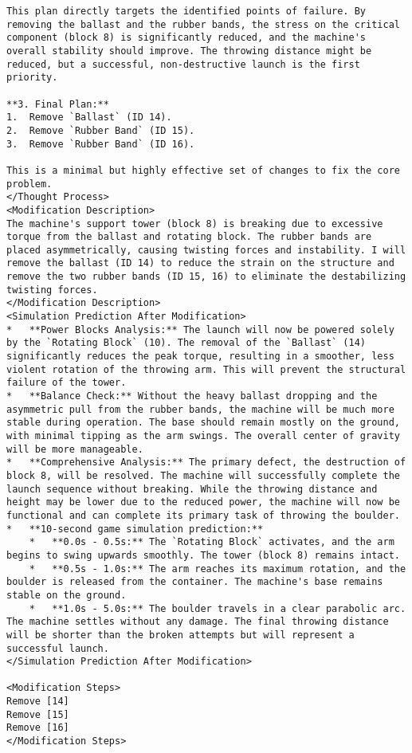 \begin{lstlisting}
This plan directly targets the identified points of failure. By removing the ballast and the rubber bands, the stress on the critical component (block 8) is significantly reduced, and the machine's overall stability should improve. The throwing distance might be reduced, but a successful, non-destructive launch is the first priority.

**3. Final Plan:**
1.  Remove `Ballast` (ID 14).
2.  Remove `Rubber Band` (ID 15).
3.  Remove `Rubber Band` (ID 16).

This is a minimal but highly effective set of changes to fix the core problem.
</Thought Process>
<Modification Description>
The machine's support tower (block 8) is breaking due to excessive torque from the ballast and rotating block. The rubber bands are placed asymmetrically, causing twisting forces and instability. I will remove the ballast (ID 14) to reduce the strain on the structure and remove the two rubber bands (ID 15, 16) to eliminate the destabilizing twisting forces.
</Modification Description>
<Simulation Prediction After Modification>
*   **Power Blocks Analysis:** The launch will now be powered solely by the `Rotating Block` (10). The removal of the `Ballast` (14) significantly reduces the peak torque, resulting in a smoother, less violent rotation of the throwing arm. This will prevent the structural failure of the tower.
*   **Balance Check:** Without the heavy ballast dropping and the asymmetric pull from the rubber bands, the machine will be much more stable during operation. The base should remain mostly on the ground, with minimal tipping as the arm swings. The overall center of gravity will be more manageable.
*   **Comprehensive Analysis:** The primary defect, the destruction of block 8, will be resolved. The machine will successfully complete the launch sequence without breaking. While the throwing distance and height may be lower due to the reduced power, the machine will now be functional and can complete its primary task of throwing the boulder.
*   **10-second game simulation prediction:**
    *   **0.0s - 0.5s:** The `Rotating Block` activates, and the arm begins to swing upwards smoothly. The tower (block 8) remains intact.
    *   **0.5s - 1.0s:** The arm reaches its maximum rotation, and the boulder is released from the container. The machine's base remains stable on the ground.
    *   **1.0s - 5.0s:** The boulder travels in a clear parabolic arc. The machine settles without any damage. The final throwing distance will be shorter than the broken attempts but will represent a successful launch.
</Simulation Prediction After Modification>

<Modification Steps>
Remove [14]
Remove [15]
Remove [16]
</Modification Steps>
\end{lstlisting}
